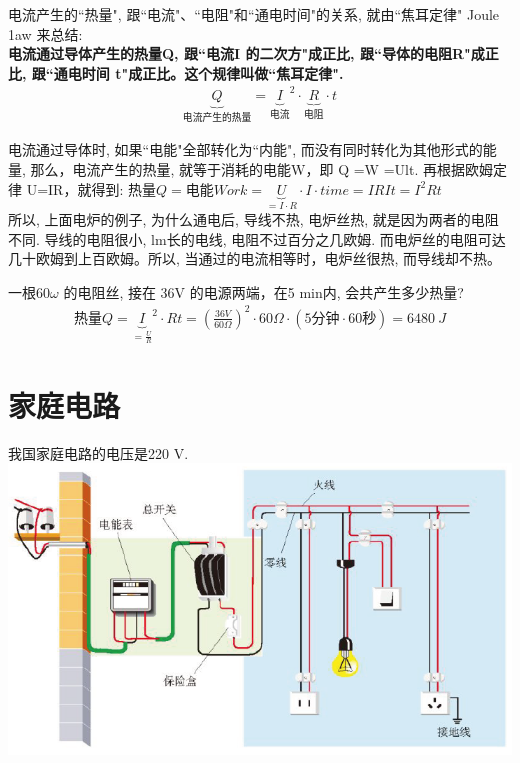 \documentclass[UTF8]{ctexart}
\begin{document}
电流产生的``热量", 跟``电流"、``电阻"和``通电时间"的关系, 就由``焦耳定律" Joule 1aw 来总结: \\
\textbf{电流通过导体产生的热量Q, 跟``电流I 的二次方"成正比, 跟``导体的电阻R"成正比, 跟``通电时间 t"成正比。这个规律叫做``焦耳定律".}
\begin{align*}
	\boxed{
		\underset{\text{电流产生的热量}}{\underbrace{Q}}=\underset{\text{电流}}{\underbrace{I}}^2\cdot \underset{\text{电阻}}{\underbrace{R}}\cdot t
			}
\end{align*} 

电流通过导体时, 如果``电能"全部转化为``内能", 而没有同时转化为其他形式的能量, 那么，电流产生的热量, 就等于消耗的电能W，即 Q =W =Ult. 再根据欧姆定律 U=IR，就得到: $\text{热量}Q=\text{电能}Work=\underset{=I\cdot R}{\underbrace{U}}\cdot I\cdot time=IRIt=I^2Rt$ \\

所以, 上面电炉的例子, 为什么通电后, 导线不热, 电炉丝热, 就是因为两者的电阻不同. 导线的电阻很小, lm长的电线, 电阻不过百分之几欧姆. 而电炉丝的电阻可达几十欧姆到上百欧姆。所以, 当通过的电流相等时，电炉丝很热, 而导线却不热。 \\



\begin{tcolorbox}[title = {例},boxrule={0.1em},colframe={black!10}, colback={black!3},colbacktitle={black!10},coltitle={black}]
一根$60 \omega$ 的电阻丝, 接在 36V 的电源两端，在5 min内, 会共产生多少热量? 
\begin{align*}
	\text{热量}Q=\underset{=\frac{U}{R}}{\underbrace{I}}^2\cdot Rt=\left( \frac{36V}{60\varOmega} \right) ^2\cdot 60\varOmega \cdot \left( 5\text{分钟}\cdot 60\text{秒} \right) =6480\ J	
\end{align*}
\end{tcolorbox}


\underline{}



\section{家庭电路}

我国家庭电路的电压是220 V. \\

\includegraphics[width=1\textwidth]{img/0061.png} \\
\end{document}
